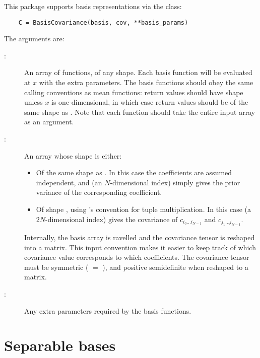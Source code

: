 \documentclass[article]{jss}
\begin{document}
This package supports basis representations via the  class:
\begin{verbatim}
    C = BasisCovariance(basis, cov, **basis_params)
\end{verbatim}
The arguments are:
\begin{description}
    \item[:] An array of functions, of any shape. Each basis function will be evaluated at $x$ with the extra parameters. The basis functions should obey the same calling conventions as mean functions: return values should have shape  unless $x$ is one-dimensional, in which case return values should be of the same shape as . Note that each function should take the entire input array as an argument.
    \item[:] An array whose shape is either:
        \begin{itemize}
            \item Of the same shape as . In this case the coefficients are assumed independent, and  (an $N$-dimensional index) simply gives the prior variance of the corresponding coefficient.
            \item Of shape , using 's convention for tuple multiplication. In this case  (a $2N$-dimensional index) gives the covariance of $c_{i_0\ldots i_{N-1}}$ and $c_{j_1\ldots j_{N-1}}$.
        \end{itemize}
        Internally, the basis array is ravelled and the covariance tensor is reshaped into a matrix. This input convention makes it easier to keep track of which covariance value corresponds to which coefficients. The covariance tensor must be symmetric ( $=$ ), and positive semidefinite when reshaped to a matrix.
    \item[:] Any extra parameters required by the basis functions.
\end{description}

\section{Separable bases}
\end{document}
